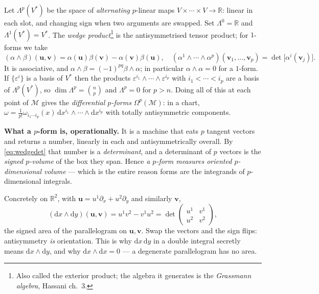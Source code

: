 \documentclass[10pt,a4paper]{article}
\newcommand{\dd}{\mathrm{d}}
\newcommand{\R}{\mathbb{R}}
\newcommand{\M}{\mathcal{M}}
\newcommand{\Om}{\Omega}
\newcommand{\vv}{\mathbf{v}}
\newcommand{\uu}{\mathbf{u}}
\theoremstyle{plain}
\theoremstyle{definition}
\numberwithin{equation}{section}
\begin{document}
Let $\Lambda^p(V^*)$ be the space of \emph{alternating} $p$-linear maps
$V\times\cdots\times V\to\R$: linear in each slot, and changing sign when two arguments are
swapped. Set $\Lambda^0=\R$ and $\Lambda^1(V^*)=V^*$. The \emph{wedge
product}\footnote{Also called the exterior product; the algebra it generates is the
\emph{Grassmann algebra}, Hassani ch.\ 3.} is the antisymmetrised tensor product; for $1$-forms
we take
\begin{equation}
(\alpha\wedge\beta)(\uu,\vv)=\alpha(\uu)\beta(\vv)-\alpha(\vv)\beta(\uu),
\quad
(\alpha^1\wedge\cdots\wedge\alpha^p)(\vv_1,\dots,\vv_p)=\det\!\big[\alpha^i(\vv_j)\big].
\label{eq:wedgedet}
\end{equation}
It is associative, and $\alpha\wedge\beta=(-1)^{pq}\beta\wedge\alpha$; in particular
$\alpha\wedge\alpha=0$ for a $1$-form. If $\{\varepsilon^i\}$ is a basis of $V^*$ then the
products $\varepsilon^{i_1}\wedge\cdots\wedge\varepsilon^{i_p}$ with $i_1<\cdots<i_p$ are a
basis of $\Lambda^p(V^*)$, so $\dim\Lambda^p=\binom np$ and $\Lambda^p=0$ for $p>n$. Doing all
of this at each point of $\M$ gives the \emph{differential $p$-forms} $\Om^p(\M)$: in a chart,
$\omega=\frac{1}{p!}\omega_{i_1\cdots i_p}(x)\,\dd x^{i_1}\wedge\cdots\wedge\dd x^{i_p}$ with
totally antisymmetric components.

\begin{keybox}
\textbf{What a $p$-form is, operationally.} It is a machine that eats $p$ tangent vectors and
returns a number, linearly in each and antisymmetrically overall. By \eqref{eq:wedgedet} that
number is a \emph{determinant}, and a determinant of $p$ vectors is the \emph{signed
$p$-volume} of the box they span. Hence \emph{a $p$-form measures oriented $p$-dimensional
volume} --- which is the entire reason forms are the integrands of $p$-dimensional integrals.
\end{keybox}

\noindent Concretely on $\R^2$, with $\uu=u^1\partial_x+u^2\partial_y$ and similarly $\vv$,
\begin{equation}
(\dd x\wedge\dd y)(\uu,\vv)=u^1v^2-v^1u^2
=\det\begin{pmatrix}u^1&v^1\\u^2&v^2\end{pmatrix},
\label{eq:areaform}
\end{equation}
the signed area of the parallelogram on $\uu,\vv$. Swap the vectors and the sign flips:
antisymmetry \emph{is} orientation. This is why $\dd x\,\dd y$ in a double integral secretly
means $\dd x\wedge\dd y$, and why $\dd x\wedge\dd x=0$ --- a degenerate parallelogram has no
area.
\end{document}
